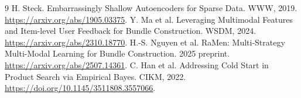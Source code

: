 \documentclass[11pt,a4paper]{article}
\begin{document}
\begin{thebibliography}{9}\small
{} H. Steck. Embarrassingly Shallow Autoencoders for Sparse Data. WWW, 2019.
\url{https://arxiv.org/abs/1905.03375}.
 Y. Ma et al. Leveraging Multimodal Features and Item-level User Feedback
for Bundle Construction. WSDM, 2024. \url{https://arxiv.org/abs/2310.18770}.
 H.-S. Nguyen et al. RaMen: Multi-Strategy Multi-Modal Learning for Bundle
Construction. 2025 preprint. \url{https://arxiv.org/abs/2507.14361}.
 C. Han et al. Addressing Cold Start in Product Search via Empirical Bayes.
CIKM, 2022. \url{https://doi.org/10.1145/3511808.3557066}.
\end{thebibliography}
\end{document}
